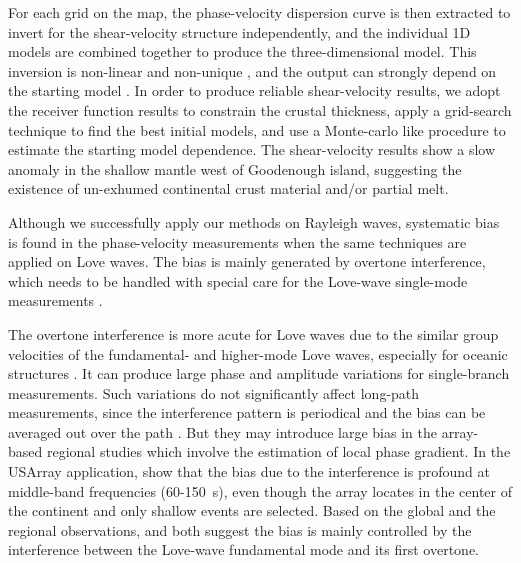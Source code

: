 \documentclass[12pt,oneside]{book}
\begin{document}
For each grid on the map, the phase-velocity dispersion curve is then extracted to invert for the shear-velocity structure independently, and the individual 1D models are combined together to produce the three-dimensional model.
This inversion is non-linear and non-unique \citep{Herrmann:2004wl}, and the output can strongly depend on the starting model \citep[e.g.][]{Foti:2009uo}. In order to produce reliable shear-velocity results, we adopt the receiver function results \citep{Abers:2012ul} to constrain the crustal thickness, apply a grid-search technique to find the best initial models, and use a Monte-carlo like procedure to estimate the starting model dependence.
The shear-velocity results show a slow anomaly in the shallow mantle west of Goodenough island, suggesting the existence of un-exhumed continental crust material and/or partial melt.

Although we successfully apply our methods on Rayleigh waves, systematic bias is found in the phase-velocity measurements when  the same techniques are applied on Love waves. 
The bias is mainly generated by overtone interference, which needs to be handled with special care for the Love-wave single-mode measurements \citep[e.g.][]{Thatcher:1969hg,Forsyth:1975tp,Gaherty:1996uf}.

The overtone interference is more acute for Love waves due to the similar group velocities of the fundamental- and higher-mode Love waves, especially for oceanic structures \citep{Nettles:2011bb}. It can produce large phase and amplitude variations for single-branch measurements.  
Such variations do not significantly affect long-path measurements, since the interference pattern is periodical and the bias can be averaged out over the path \citep{Nettles:2011bb}. But they may introduce large bias in the array-based regional studies which involve the estimation of local phase gradient. In the USArray application, \citet{Foster:2014kr} show that the bias due to the interference is profound at middle-band frequencies (60-150~s), even though the array locates in the center of the continent and only shallow events are selected. 
Based on the global and the regional observations, \citet{Nettles:2011bb} and \citet{Foster:2014kr} both suggest the bias is mainly controlled by the interference between the Love-wave fundamental mode and its first overtone.
\end{document}
